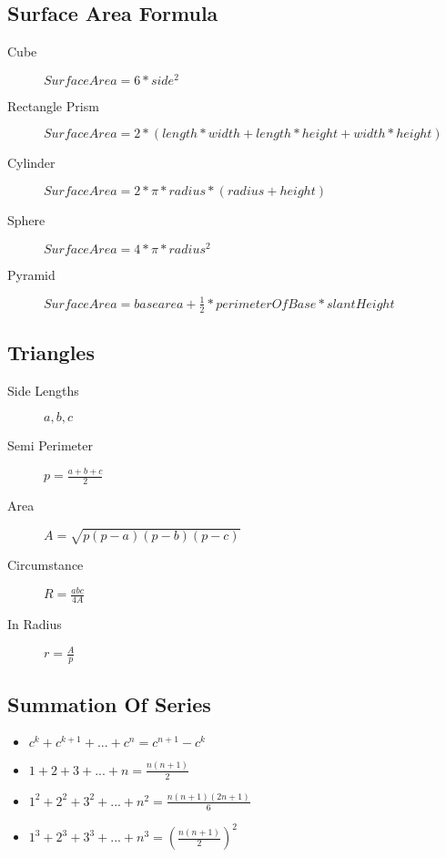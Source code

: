 \documentclass[10pt, a4paper]{article}
\begin{document}
\begin{multicols}{2}
\subsection{Surface Area Formula}
\begin{description}
    \item[Cube] 
        \begin{math}
            Surface Area = 6 *side^2
        \end{math}
    \item[Rectangle Prism] 
        \begin{math}
            Surface Area = 2 *(length*width+length*height+width*height)
        \end{math}
    \item[Cylinder] 
        \begin{math}
            Surface Area = 2*\pi*radius*(radius+height)
        \end{math}
    \item[Sphere] 
        \begin{math}
            Surface Area = 4*\pi*radius^2
        \end{math}
    \item[Pyramid] 
        \begin{math}
            Surface Area = base area + \frac{1}{2}*perimeterOfBase * slantHeight
        \end{math}
\end{description}

\subsection{Triangles}
\begin{description}
    \item[Side Lengths] \(a, b, c \)
    \item[Semi Perimeter] \( p = \frac{a+b+c}{2} \)
    \item[Area] \(A = \sqrt{p(p-a)(p-b)(p-c)}\)
    \item[Circumstance] \(R =  \frac{abc}{4A} \)
    \item[In Radius] \(r = \frac{A}{p}\) 
\end{description}
\subsection{Summation Of Series}
\begin{itemize}
    \item \(c^k + c^{k+1} +...+ c^n = c^{n+1} - c^k\)
    \item \(1+2+3+...+n=\frac{n(n+1)}{2}\)
    \item \(1^2+2^2+3^2+...+n^2=\frac{n(n+1)(2n+1)}{6}\)
    \item \(1^3+2^3+3^3+...+n^3=(\frac{n(n+1)}{2})^2\)
\end{itemize}


\end{multicols}
\end{document}
